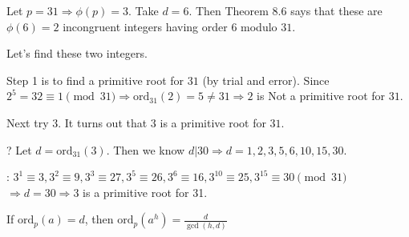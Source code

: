 \begin{eg}
    Let $p = 31 \Rightarrow \phi(p) = 3$.
    Take $d = 6$. Then Theorem 8.6 says that these are $\phi(6) = 2$ 
    incongruent integers having order $6$ modulo $31$.

    Let's find these two integers.

    Step 1 is to find a primitive root for $31$ (by trial and error).
    Since $2^5 = 32 \equiv 1 \pmod {31} \Rightarrow \text{ord}_{31}(2) = 5 \neq 31 \Rightarrow 2$ is Not a primitive root 
    for $31$.

    Next try $3$. It turns out that $3$ is a primitive root for $31$.

    ? Let $d = \text{ord}_{31}(3)$. Then we know $d | 30 \Rightarrow d = 1, 2, 3, 5, 6, 10, 15, 30$.

    : $3^1 \equiv 3, 3^2 \equiv 9, 3^3 \equiv 27, 3^5 \equiv 26, 3^6 \equiv 16, 3^{10} \equiv 25, 3^{15} \equiv 30 \pmod {31}$
    $\Rightarrow d = 30 \Rightarrow 3$ is a primitive root for 31.
\end{eg}


\begin{remark}
    If $\text{ord}_{p}(a) = d$, then $\text{ord}_{p}(a^h) = \frac{d}{\gcd(h, d)}$
\end{remark}


